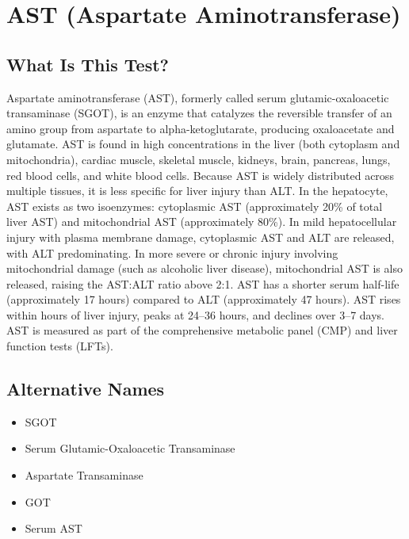 \chapter{AST (Aspartate Aminotransferase)}

\section*{What Is This Test?}
Aspartate aminotransferase (AST), formerly called serum glutamic-oxaloacetic transaminase (SGOT), is an enzyme that catalyzes the reversible transfer of an amino group from aspartate to alpha-ketoglutarate, producing oxaloacetate and glutamate. AST is found in high concentrations in the liver (both cytoplasm and mitochondria), cardiac muscle, skeletal muscle, kidneys, brain, pancreas, lungs, red blood cells, and white blood cells. Because AST is widely distributed across multiple tissues, it is less specific for liver injury than ALT. In the hepatocyte, AST exists as two isoenzymes: cytoplasmic AST (approximately 20\% of total liver AST) and mitochondrial AST (approximately 80\%). In mild hepatocellular injury with plasma membrane damage, cytoplasmic AST and ALT are released, with ALT predominating. In more severe or chronic injury involving mitochondrial damage (such as alcoholic liver disease), mitochondrial AST is also released, raising the AST:ALT ratio above 2:1. AST has a shorter serum half-life (approximately 17 hours) compared to ALT (approximately 47 hours). AST rises within hours of liver injury, peaks at 24--36 hours, and declines over 3--7 days. AST is measured as part of the comprehensive metabolic panel (CMP) and liver function tests (LFTs).

\section*{Alternative Names}
\begin{itemize}
  \item SGOT
  \item Serum Glutamic-Oxaloacetic Transaminase
  \item Aspartate Transaminase
  \item GOT
  \item Serum AST
\end{itemize}
